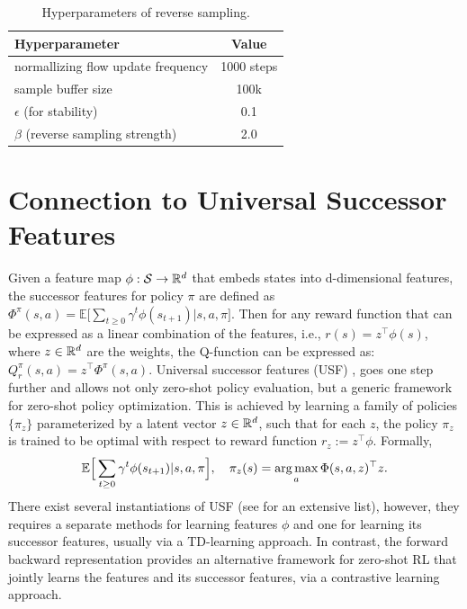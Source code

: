 \begin{table}[H]
\centering
\caption{Hyperparameters of reverse sampling.}
\begin{tabular}{l c}
\toprule
\textbf{Hyperparameter} & \textbf{Value} \\
\midrule
normallizing flow update frequency & 1000 steps \\
sample buffer size & 100k \\
$\epsilon$ (for stability) & 0.1 \\
$\beta$ (reverse sampling strength) & 2.0 \\
\bottomrule
\end{tabular}
\label{tab:reverse_sampling_hyperparameters}
\end{table}


\section{Connection to Universal Successor Features}
\label{appendix:extended_rel_work}
Given a feature map $\phi: {\mathcal{S}} \rightarrow {\mathbb{R}}^d$ that embeds states into d-dimensional features,  the successor features \citep{barreto2017successor} for policy $\pi$ are defined as $\Phi^\pi(s,a) = \mathbb{E}\big[\sum_{t\geq0}\gamma^t \phi(s_{t+1}) | s,a,\pi\big]$. Then for any reward function that can be expressed as a linear combination of the features, i.e., $r(s)= z^\top\phi(s)$, where $z \in {\mathbb{R}}^d$ are the weights, the Q-function can be expressed as: $Q_r^\pi(s,a) = z^\top\Phi^\pi(s,a)$. 
Universal successor features (USF) \citep{borsauniversal}, goes one step further and allows not only zero-shot policy evaluation, but a generic framework for zero-shot policy optimization. This is achieved by learning a family of policies $\{\pi_z\}$ parameterized by a latent vector $z \in {\mathbb{R}}^d$, such that for each $z$, the policy $\pi_z$ is trained to be optimal with respect to reward function $r_z:= z^\top\phi$. Formally,
\begin{equation}\label{eq:usf}
   \mathbb{E}\Big[\sum_{t\geq0}\gamma^t \phi(s_{t+1}) | s,a,\pi\Big], \quad \pi_z(s) = \operatorname*{arg\,max}_{a} \Phi(s,a,z)^\top  z.
\end{equation}
There exist several instantiations of USF \citep{agarwal2024proto, park2024foundation} (see \citep{touati2023does} for an extensive list), however, they requires a separate methods for learning features $\phi$ and one for learning its successor features, usually via a TD-learning approach. In contrast, the forward backward representation \citep{touati2021learning} provides an alternative framework for zero-shot RL that jointly learns the features and its successor features, via a contrastive learning approach. 

